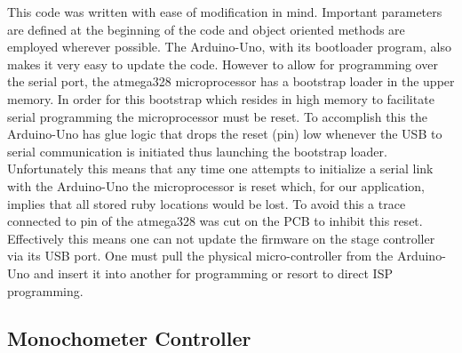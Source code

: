 This code was written with ease of modification in mind.  Important parameters are defined at the beginning of the code and object oriented methods are employed wherever possible.  The Arduino\--Uno, with its bootloader program, also makes it very easy to update the code.  However to allow for programming over the serial port, the atmega328 microprocessor has a bootstrap loader in the upper memory.  In order for this bootstrap which resides in high memory to facilitate serial programming the microprocessor must be reset.  To accomplish this the Arduino\--Uno has glue logic that drops the reset (pin) low whenever the USB to serial communication is initiated thus launching the bootstrap loader.  Unfortunately this means that any time one attempts to initialize a serial link with the Arduino\--Uno the microprocessor is reset which, for our application, implies that all stored ruby locations would be lost.  To avoid this a trace connected to pin of the atmega328 was cut on the PCB to inhibit this reset.  Effectively this means one can not update the firmware on the stage controller via its USB port.  One must pull the physical micro-controller from the Arduino\--Uno and insert it into another for programming or resort to direct ISP programming. 

\subsection{Monochometer Controller}

